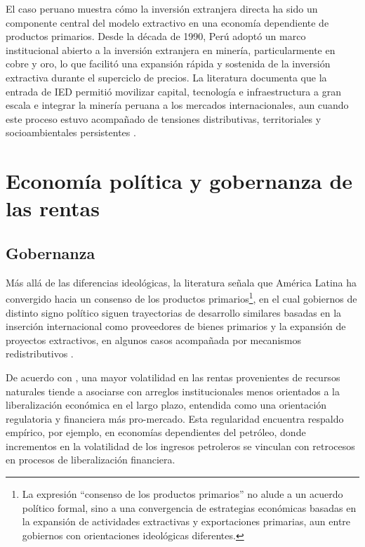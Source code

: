 \documentclass[../../TFM.tex]{subfiles}
\begin{document}
	El caso peruano muestra cómo la inversión extranjera directa ha sido un componente central del modelo extractivo en una economía dependiente de productos primarios. Desde la década de 1990, Perú adoptó un marco institucional abierto a la inversión extranjera en minería, particularmente en cobre y oro, lo que facilitó una expansión rápida y sostenida de la inversión extractiva durante el superciclo de precios. La literatura documenta que la entrada de IED permitió movilizar capital, tecnología e infraestructura a gran escala e integrar la minería peruana a los mercados internacionales, aun cuando este proceso estuvo acompañado de tensiones distributivas, territoriales y socioambientales persistentes \parencite{Bebbington2013}.
	
	\section{Economía política y gobernanza de las rentas}
	\label{sec:economia-politica}
	
	\subsection{Gobernanza}
	\label{subsec:gobernanza}
	
	Más allá de las diferencias ideológicas, la literatura señala que América Latina ha convergido hacia un consenso de los productos primarios\footnote{La expresión ``consenso de los productos primarios'' no alude a un acuerdo político formal, sino a una convergencia de estrategias económicas basadas en la expansión de actividades extractivas y exportaciones primarias, aun entre gobiernos con orientaciones ideológicas diferentes.}, en el cual gobiernos de distinto signo político siguen trayectorias de desarrollo similares basadas en la inserción internacional como proveedores de bienes primarios y la expansión de proyectos extractivos, en algunos casos acompañada por mecanismos redistributivos \parencite{Svampa2013}.
	
	De acuerdo con \textcite{Boucekkine2021}, una mayor volatilidad en las rentas provenientes de recursos naturales tiende a asociarse con arreglos institucionales menos orientados a la liberalización económica en el largo plazo, entendida como una orientación regulatoria y financiera más pro-mercado. Esta regularidad encuentra respaldo empírico, por ejemplo, en economías dependientes del petróleo, donde incrementos en la volatilidad de los ingresos petroleros se vinculan con retrocesos en procesos de liberalización financiera.
	
\end{document}
